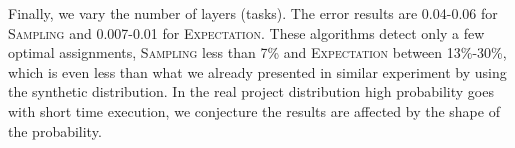 \documentclass[letterpaper]{article} %
\newcommand{\sampling}{\textsc{Sampling}\xspace}
\newcommand{\expectation}{\textsc{Expectation}\xspace}
\begin{document}
Finally, we vary the number of layers (tasks).
The error results are 0.04-0.06 for \sampling and 0.007-0.01 for \expectation. These algorithms detect only a few optimal assignments, \sampling less than 7\% and \expectation between 13\%-30\%, which is even less than what we already presented in similar experiment by using the synthetic distribution. In the real project distribution high probability goes with short time execution, we conjecture the results are affected by the shape of the probability.
\end{document}
